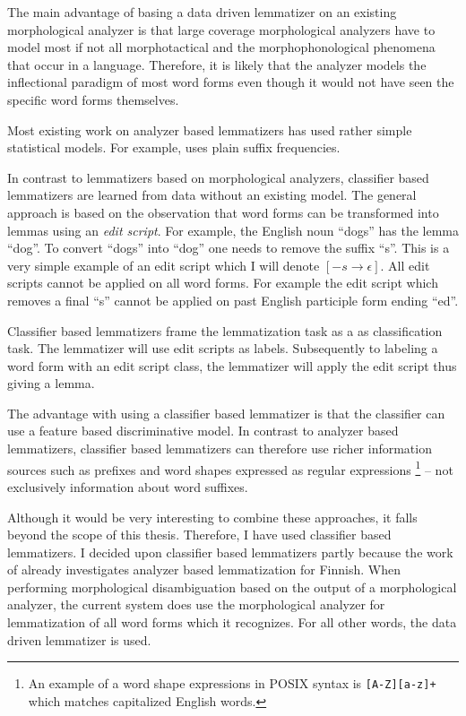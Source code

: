 The main advantage of basing a data driven lemmatizer on an existing
morphological analyzer is that large coverage morphological analyzers
have to model most if not all morphotactical and the
morphophonological phenomena that occur in a language. Therefore, it
is likely that the analyzer models the inflectional paradigm of most
word forms even though it would not have seen the specific word forms
themselves.

Most existing work on analyzer based lemmatizers has used rather
simple statistical models. For example, \cite{Linden2009} uses plain
suffix frequencies. 

In contrast to lemmatizers based on morphological analyzers,
classifier based lemmatizers \cite{Chrupala2008} are learned from data
without an existing model. The general approach is based on the
observation that word forms can be transformed into lemmas using an
{\it edit script}. For example, the English noun ``dogs'' has the
lemma ``dog''. To convert ``dogs'' into ``dog'' one needs to remove
the suffix ``s''. This is a very simple example of an edit script
which I will denote $[-s \rightarrow \epsilon]$. All edit scripts
cannot be applied on all word forms. For example the edit script which
removes a final ``s'' cannot be applied on past English participle
form ending ``ed''.

Classifier based lemmatizers frame the lemmatization task as a as
classification task. The lemmatizer will use edit scripts as
labels. Subsequently to labeling a word form with an edit script
class, the lemmatizer will apply the edit script thus giving a lemma.

The advantage with using a classifier based lemmatizer is that the
classifier can use a feature based discriminative model. In contrast
to analyzer based lemmatizers, classifier based lemmatizers can
therefore use richer information sources such as prefixes and word
shapes expressed as regular expressions \footnote{An example of a word
  shape expressions in POSIX syntax is {\tt [A-Z][a-z]+} which matches
  capitalized English words.} -- not exclusively information about
word suffixes.

Although it would be very interesting to combine these approaches, it
falls beyond the scope of this thesis. Therefore, I have used
classifier based lemmatizers. I decided upon classifier based
lemmatizers partly because the work of \cite{Linden2009} already
investigates analyzer based lemmatization for Finnish. When performing
morphological disambiguation based on the output of a morphological
analyzer, the current system does use the morphological analyzer for
lemmatization of all word forms which it recognizes. For all other
words, the data driven lemmatizer is used.

